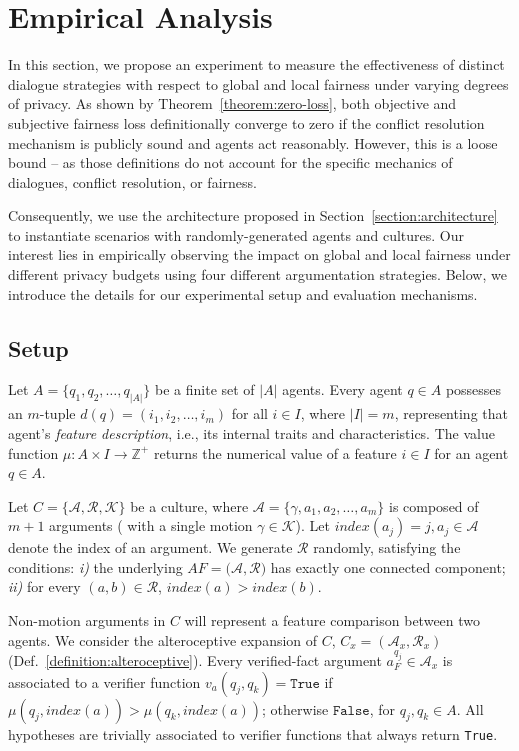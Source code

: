 \documentclass[acmsmall]{custom-arxiv}  %
\begin{document}
\section{Empirical Analysis}
\label{section:random-experiments}


In this section, we propose an experiment to measure the effectiveness of distinct dialogue strategies with respect to global and local fairness under varying degrees of privacy. As shown by Theorem~\ref{theorem:zero-loss}, both objective and subjective fairness loss definitionally converge to zero if the conflict resolution mechanism is publicly sound and agents act reasonably. However, this is a loose bound -- as those definitions do not account for the specific mechanics of dialogues, conflict resolution, or fairness.

Consequently, we use the architecture proposed in Section~\ref{section:architecture} to instantiate scenarios with randomly-generated agents and cultures. Our interest lies in empirically observing the impact on global and local fairness under different privacy budgets using four different argumentation strategies. Below, we introduce the details for our experimental setup and evaluation mechanisms.

\subsection{Setup}
\label{section:random-setup}
Let $A = \{q_1, q_2, \dots, q_{|A|}\}$ be a finite set of ${|A|}$ agents. Every agent $q \in A$ possesses an $m$-tuple $d(q) = (i_1, i_2, \dots, i_m)$ for all $i \in I$, where $|I| = m$, representing that agent's \textit{feature description}, i.e., its internal traits and characteristics. The value function $\mu: A \times I \rightarrow \mathbb{Z}^+$ returns the numerical value of a feature $i \in I$ for an agent $q \in A$.

Let $C = \{\mathcal{A}, \mathcal{R}, \mathcal{K}\}$ be a culture, where $\mathcal{A} = \{\gamma, a_1, a_2, \dots, a_m\}$ is composed of $m + 1$ arguments (%
with a single motion $\gamma \in \mathcal{K}$). Let $\textit{index}(a_j) = j, a_j \in \mathcal{A}$ denote the index of an argument. We generate $\mathcal{R}$ randomly, satisfying the conditions: \textit{i)} the underlying $AF = (\mathcal{A}, \mathcal{R)}$ has exactly one connected component; \textit{ii)} for every $(a, b) \in \mathcal{R}$, $\textit{index}(a) > \textit{index}(b)$. 

Non-motion arguments in $C$ will represent a feature comparison between two agents. We consider the alteroceptive expansion of $C$, $C_x = (\mathcal{A}_x, \mathcal{R}_x)$ (Def.~\ref{definition:alteroceptive}). Every verified-fact argument $a_{F}^{q_j} \in \mathcal{A}_x$ is associated to a verifier function $v_a(q_j, q_k) = \texttt{True}$ if $\mu(q_j, \textit{index}(a)) > \mu(q_k, \textit{index}(a))$; otherwise $\texttt{False}$, for $q_j, q_k \in A$. All hypotheses are trivially associated to verifier functions that always return \texttt{True}.
\end{document}
